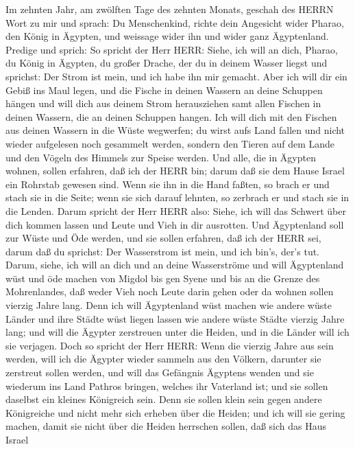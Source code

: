  Im zehnten Jahr, am zwölften Tage des zehnten Monats,
geschah des HERRN Wort zu mir und sprach:  Du Menschenkind,
richte dein Angesicht wider Pharao, den König in Ägypten, und weissage
wider ihn und wider ganz Ägyptenland.  Predige und sprich:
So spricht der Herr HERR: Siehe, ich will an dich, Pharao, du König in
Ägypten, du großer Drache, der du in deinem Wasser liegst und sprichst:
Der Strom ist mein, und ich habe ihn mir gemacht.  Aber ich
will dir ein Gebiß ins Maul legen, und die Fische in deinen Wassern an
deine Schuppen hängen und will dich aus deinem Strom herausziehen samt
allen Fischen in deinen Wassern, die an deinen Schuppen hangen.
 Ich will dich mit den Fischen aus deinen Wassern in die
Wüste wegwerfen; du wirst aufs Land fallen und nicht wieder aufgelesen
noch gesammelt werden, sondern den Tieren auf dem Lande und den Vögeln
des Himmels zur Speise werden.  Und alle, die in Ägypten
wohnen, sollen erfahren, daß ich der HERR bin; darum daß sie dem Hause
Israel ein Rohrstab gewesen sind.  Wenn sie ihn in die Hand
faßten, so brach er und stach sie in die Seite; wenn sie sich darauf
lehnten, so zerbrach er und stach sie in die Lenden.  Darum
spricht der Herr HERR also: Siehe, ich will das Schwert über dich kommen
lassen und Leute und Vieh in dir ausrotten.  Und Ägyptenland
soll zur Wüste und Öde werden, und sie sollen erfahren, daß ich der HERR
sei, darum daß du sprichst: Der Wasserstrom ist mein, und ich bin's,
der's tut.  Darum, siehe, ich will an dich und an deine
Wasserströme und will Ägyptenland wüst und öde machen von Migdol bis gen
Syene und bis an die Grenze des Mohrenlandes,  daß weder
Vieh noch Leute darin gehen oder da wohnen sollen vierzig Jahre lang.
 Denn ich will Ägyptenland wüst machen wie andere wüste
Länder und ihre Städte wüst liegen lassen wie andere wüste Städte
vierzig Jahre lang; und will die Ägypter zerstreuen unter die Heiden,
und in die Länder will ich sie verjagen.  Doch so spricht
der Herr HERR: Wenn die vierzig Jahre aus sein werden, will ich die
Ägypter wieder sammeln aus den Völkern, darunter sie zerstreut sollen
werden,  und will das Gefängnis Ägyptens wenden und sie
wiederum ins Land Pathros bringen, welches ihr Vaterland ist; und sie
sollen daselbst ein kleines Königreich sein.  Denn sie
sollen klein sein gegen andere Königreiche und nicht mehr sich erheben
über die Heiden; und ich will sie gering machen, damit sie nicht über
die Heiden herrschen sollen,  daß sich das Haus Israel
